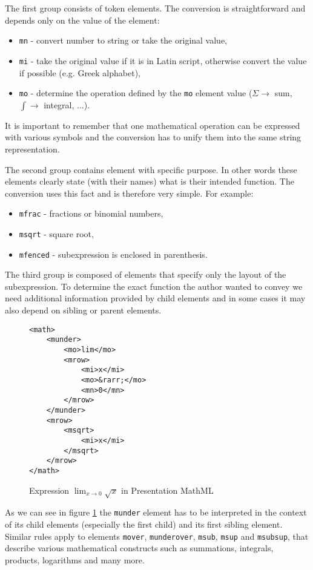 \documentclass[11pt,oneside,final]{fithesis2}
\begin{document}
The first group consists of token elements. The conversion is straightforward and depends only on the value of the element:
\begin{itemize}
\item \texttt{mn} - convert number to string or take the original value,
\item \texttt{mi} - take the original value if it is in Latin script, otherwise convert the value if possible (e.g. Greek alphabet),
\item \texttt{mo} - determine the operation defined by the \texttt{mo} element value ($\Sigma \rightarrow$ sum, $\int \rightarrow$ integral, $\ldots$).
\end{itemize}
It is important to remember that one mathematical operation can be expressed with various symbols and the conversion has to unify them into the same string representation.

The second group contains element with specific purpose. In other words these elements clearly state (with their names) what is their intended function. The conversion uses this fact and is therefore very simple. For example:
\begin{itemize}
\item \texttt{mfrac} - fractions or binomial numbers,
\item \texttt{msqrt} - square root,
\item \texttt{mfenced} - subexpression is enclosed in parenthesis.
\end{itemize}

The third group is composed of elements that specify only the layout of the subexpression. To determine the exact function the author wanted to convey we need additional information provided by child elements and in some cases it may also depend on sibling or parent elements. 
\begin{figure}[!ht]
\lstset{language=XML,frame=lines}
\begin{lstlisting}
<math>
	<munder>
		<mo>lim</mo>
		<mrow>
			<mi>x</mi>
			<mo>&rarr;</mo>
			<mn>0</mn>
		</mrow>		
	</munder>
	<mrow>
		<msqrt>
			<mi>x</mi>
		</msqrt>
	</mrow>
</math>
\end{lstlisting}
\caption{Expression $\lim_{x \to 0}\sqrt{x}$ in Presentation MathML}
\label{fig:mathmllimit}
\end{figure}

As we can see in figure \ref{fig:mathmllimit} the \texttt{munder} element has to be interpreted in the context of its child elements (especially the first child) and its first sibling element. Similar rules apply to elements \texttt{mover}, \texttt{munderover}, \texttt{msub}, \texttt{msup} and \texttt{msubsup}, that describe various mathematical constructs such as summations, integrals, products, logarithms and many more.
\end{document}
